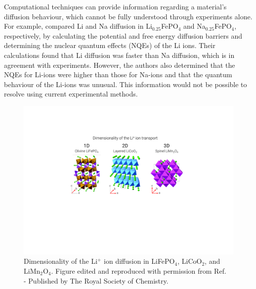 \documentclass[../main.tex]{subfiles}
\begin{document}
Computational techniques can provide information regarding a material's diffusion behaviour, which cannot be fully understood through experiments alone. For example, \citeauthor{dixit2015classical} compared Li and Na diffusion in Li$_{0.25}$FePO$_4$ and Na$_{0.25}$FePO$_4$, respectively, by calculating the potential and free energy diffusion barriers and determining the nuclear quantum effects (NQEs) of the Li ions. \cite{dixit2015classical} Their calculations found that Li diffusion was faster than Na diffusion, which is in agreement with experiments. However, the authors also determined that the NQEs for Li-ions were higher than those for Na-ions and that the quantum behaviour of the Li-ions was unusual. This information would not be possible to resolve using current experimental methods.

\begin{figure}
    \centering
    \includegraphics[scale=0.8]{figures/cathode_diffusion_pathways.pdf}
    \caption{Dimensionality of the Li$^+$ ion diffusion in LiFePO$_4$, LiCoO$_2$, and LiMn$_2$O$_4$. Figure edited and reproduced with permission from Ref.~ - Published by The Royal Society of Chemistry.}
    \label{fig:cathode_diffusion_pathways}
\end{figure}
\end{document}
